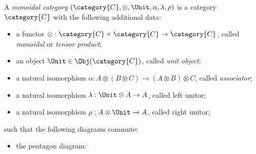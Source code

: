 \documentclass[DIN, pagenumber=false, fontsize=11pt, parskip=half, colorinlistoftodos, svgnames]{scrartcl}
\begin{document}
	
	\begin{definition}
		\label{def: monoCat}
		A \emph{monoidal category} $(\category{C}, \otimes, \Unit, \alpha, \lambda, \rho)$ is a category $\category{C}$ with the following additional data:
		\begin{itemize}
			\item a functor $\otimes : \category{C} \times \category{C} \rightarrow \category{C} $, called \emph{monoidal} or \emph{tensor product};
			\item an object $\Unit \in  \Obj(\category{C})$, called \emph{unit object};
			\item a natural isomorphism $\alpha: A \otimes (B \otimes C ) \rightarrow (A \otimes B) \otimes C$, called \emph{associator};
			\item a natural isomorphism $\lambda: \Unit \otimes A \rightarrow A$, called left unitor;
			\item a natural isomorphism $\rho: A \otimes \Unit \rightarrow A$, called right unitor;
		\end{itemize}
		such that the following diagrams commute:
		\begin{itemize}
			\item the pentagon diagram: 
			\begin{center}
			\end{center}
			

\end{itemize}
\end{definition}
\end{document}
